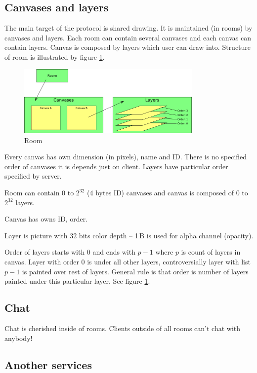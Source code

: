 \subsection{Canvases and layers}

The main target of the protocol is shared drawing. It is maintained (in rooms) by canvases and layers. Each room can contain several canvases and each canvas can contain layers. Canvas is composed by layers which user can draw into. Structure of room is illustrated by figure \ref{server.pictures.room}.

\begin{figure}[h]
  \centering
  \includegraphics[width=0.80\textwidth]{diagrams/room.png}
  \caption{Room}
  \label{server.pictures.room}
\end{figure}

Every canvas has own dimension (in pixels), name and ID. There is no specified order of canvases it is depends just on client. Layers have particular order specified by server.

Room can contain $0$ to $2^{32}$ (4 bytes ID) canvases and canvas is composed of $0$ to $2^{32}$ layers.

Canvas has owns ID, order.

Layer is picture with $32$ bits color depth -- 1\,{}B is used for alpha channel (opacity).

Order of layers starts with $0$ and ends with $p - 1$ where $p$ is count of layers in canvas. Layer with order $0$ is under all other layers, controversially layer with list $p - 1$ is painted over rest of layers. General rule is that order is number of layers painted under this particular layer. See figure \ref{server.pictures.room}.

\subsection{Chat}

Chat is cherished inside of rooms.  Clients outside of all rooms can't chat with anybody!

\subsection{Another services}


